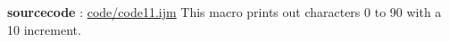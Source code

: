 \textbf{sourcecode} : \href{http://www.example.com/contents}{code/code11.ijm}
This macro prints out characters 0 to 90 with a 10 increment.